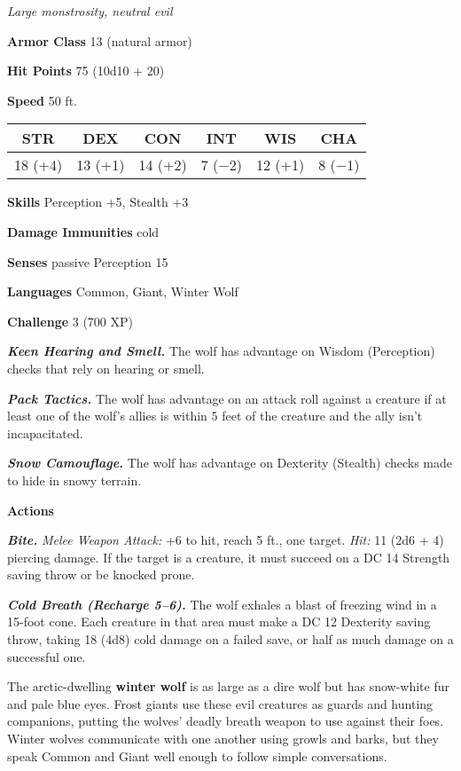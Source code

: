 \documentclass[
]{article}
\begin{document}
\emph{Large monstrosity, neutral evil}

\textbf{Armor Class} 13 (natural armor)

\textbf{Hit Points} 75 (10d10 + 20)

\textbf{Speed} 50 ft.

\begin{longtable}[]{@{}cccccc@{}}
\toprule
STR & DEX & CON & INT & WIS & CHA\tabularnewline
\midrule
\endhead
18 (+4) & 13 (+1) & 14 (+2) & 7 (−2) & 12 (+1) & 8 (−1)\tabularnewline
\bottomrule
\end{longtable}

\textbf{Skills} Perception +5, Stealth +3

\textbf{Damage Immunities} cold

\textbf{Senses} passive Perception 15

\textbf{Languages} Common, Giant, Winter Wolf

\textbf{Challenge} 3 (700 XP)

\emph{\textbf{Keen Hearing and Smell.}} The wolf has advantage on Wisdom
(Perception) checks that rely on hearing or smell.

\emph{\textbf{Pack Tactics.}} The wolf has advantage on an attack roll
against a creature if at least one of the wolf's allies is within 5 feet
of the creature and the ally isn't incapacitated.

\emph{\textbf{Snow Camouflage.}} The wolf has advantage on Dexterity
(Stealth) checks made to hide in snowy terrain.

\textbf{Actions}

\emph{\textbf{Bite.}} \emph{Melee Weapon Attack:} +6 to hit, reach 5
ft., one target. \emph{Hit:} 11 (2d6 + 4) piercing damage. If the target
is a creature, it must succeed on a DC 14 Strength saving throw or be
knocked prone.

\emph{\textbf{Cold Breath (Recharge 5--6).}} The wolf exhales a blast of
freezing wind in a 15-foot cone. Each creature in that area must make a
DC 12 Dexterity saving throw, taking 18 (4d8) cold damage on a failed
save, or half as much damage on a successful one.

The arctic-dwelling \textbf{winter wolf} is as large as a dire wolf but
has snow-white fur and pale blue eyes. Frost giants use these evil
creatures as guards and hunting companions, putting the wolves' deadly
breath weapon to use against their foes. Winter wolves communicate with
one another using growls and barks, but they speak Common and Giant well
enough to follow simple conversations.
\end{document}
